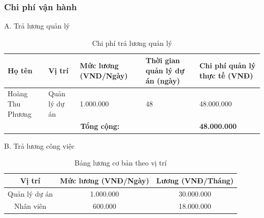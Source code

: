 \subsubsection{Chi phí vận hành}
A. Trả lương quản lý
\begin{table}[H]
    \centering
    \renewcommand{\arraystretch}{1.5} %
    \begin{tabular}{|p{3cm}|p{2.5cm}|p{2.3cm}|p{2cm}|p{3cm}|}
        \hline
        \textbf{Họ tên}                           & \textbf{Vị trí}     & \textbf{Mức lương (VND/Ngày)} & \textbf{Thời gian quản lý dự án (ngày)} & \textbf{Chi phí quản lý thực tế (VNĐ)} \\
        \hline
        Hoàng Thu Phương                          & Quản lý dự án       & 1.000.000                     & 48                                      & 48.000.000                             \\
        \hline
        \multicolumn{4}{|c|}{\textbf{Tổng cộng:}} & \textbf{48.000.000}                                                                                                                    \\
        \hline
    \end{tabular}
    \caption{Chi phí trả lương quản lý}
\end{table}

B. Trả lương công việc
\begin{table}[H]
    \centering
    \renewcommand{\arraystretch}{1.5} %
    \caption{Bảng lương cơ bản theo vị trí}
    \begin{tabular}{|c|c|c|}
        \hline
        \textbf{Vị trí} & \textbf{Mức lương (VNĐ/Ngày)} & \textbf{Lương (VNĐ/Tháng)} \\
        \hline
        Quản lý dự án   & 1.000.000                     & 30.000.000                 \\
        \hline
        Nhân viên       & 600.000                       & 18.000.000                 \\
        \hline
    \end{tabular}
\end{table}

